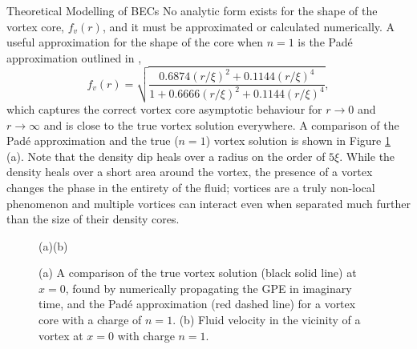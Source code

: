\begin{chapter}{\label{cha:theoretical_model}Theoretical Modelling of BECs}
No analytic form exists for the shape of the vortex core, $f_v(r)$, and it must be approximated or calculated numerically. A useful approximation for the shape of the core when $n=1$ is the Pad\'e approximation outlined in \cite{berloff2004},
	\begin{equation}
		f_v(r) = \sqrt{\frac{0.6874(r/\xi)^2 + 0.1144(r/\xi)^4}{1+0.6666(r/\xi)^2+0.1144(r/\xi)^4}},
	\end{equation}
which captures the correct vortex core asymptotic behaviour for $r\rightarrow 0$ and $r\rightarrow\infty$ and is close to the true vortex solution everywhere. A comparison of the Pad\'e approximation and the true ($n=1$) vortex solution is shown in Figure \ref{fig_vortex} (a). Note that the density dip heals over a radius on the order of $5\xi$. While the density heals over a short area around the vortex, the presence of a vortex changes the phase in the entirety of the fluid; vortices are a truly non-local phenomenon and multiple vortices can interact even when separated much further than the size of their density cores.

\begin{figure}[!ht]
	\hspace{-0.13\linewidth}(a)\hspace{0.45\linewidth}(b)\hspace{0.03\linewidth}\\
	\centering
  \caption{(a) A comparison of the true vortex solution (black solid line) at $x=0$, found by numerically propagating the GPE in imaginary time, and the Pad\'e approximation (red dashed line) for a vortex core with a charge of $n=1$. (b) Fluid velocity in the vicinity of a vortex at $x=0$ with charge $n=1$.}\label{fig_vortex}
 \end{figure}


\end{chapter}
